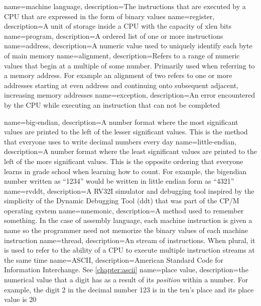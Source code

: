 {
	name={machine language},
	description={The instructions that are executed by a CPU that are expressed
		in the form of \gls{binary} values}
}
{
	name={register},
	description={A unit of storage inside a CPU with the capacity of \gls{xlen} \gls{bit}s}
}
{
	name={program},
	description={A ordered list of one or more instructions}
}
{
	name={address},
	description={A numeric value used to uniquely identify each \gls{byte} of main memory}
}
{
	name={alignment},
	description={Refers to a range of numeric values that begin 
		at a multiple of some number.  Primarily used when referring to
		a memory address.  For example an alignment of two refers to one
		or more addresses starting at even address and continuing onto
		subsequent adjacent, increasing memory addresses}
}
{
	name={exception},
	description={An error encountered by the CPU while executing an instruction
		that can not be completed}
}

{
	name={big-endian},
	description={A number format where the most significant values are 
	printed to the left of the lesser significant values.  This is the
	method that everyone uses to write decimal numbers every day}
}
{
	name={little-endian},
	description={A number format where the least significant values are 
		printed to the left of the more significant values.  This is the
		opposite ordering that everyone learns in grade school when learning
		how to count.  For example, the \gls{bigendian} number written as ``1234''
		would be written in little endian form as ``4321''}
}
{
	name={rvddt},
	description={A RV32I simulator and debugging tool inspired by the 
		simplicity of the Dynamic Debugging Tool (ddt) that was part of 
		the CP/M operating system}
}
{
	name={mnemonic},
	description={A method used to remember something.  In the case of
		assembly language, each machine instruction is given a name
		so the programmer need not memorize the binary values of each
		machine instruction}
}
{
	name={thread},
	description={An stream of instructions.  When plural, it is
		used to refer to the ability of a CPU to execute multiple 
		instruction streams at the same time}
}
{
	name={ASCII},
	description={American Standard Code for Information Interchange.
		See \autoref{chapter:ascii}}
}
{
	name={place value},
	description={the numerical value that a digit has as a result of its {\em position} within a number.
	For example, the digit 2 in the decimal number 123 is in the ten's place and its place value is 20}
}


